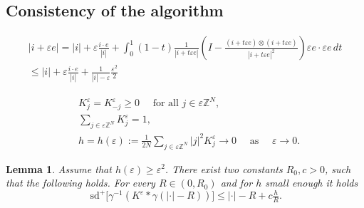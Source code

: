 \documentclass[10pt,a4paper]{amsart}
\newtheorem{lemma}{Lemma}
\newcommand{\Z}{\mathbb{Z}}
\newcommand{\e}{\varepsilon}
\newcommand{\sd}{\,\mathrm{sd}}
\begin{document}
\subsection{Consistency of the algorithm}\label{sec:consistexplicit}

  \begin{multline}
    |i+\e e| = |i| + \e\frac{i\cdot e}{|i|} +
    \int_0^1 (1-t) \frac{1}{|i+t\e e|}\left(I - \frac{(i+t\e e)\otimes (i+t\e e)}{|i+t\e e|^2}
    \right)\e e \cdot \e e\,dt  \\ 
    \le  |i| + \e\frac{i\cdot e}{|i|} + \frac{1}{|i|-\e}\frac{\e^2}{2}
  \end{multline}

\begin{align}
  & \textstyle  K_j^\e= K_{-j}^\e \ge 0 \quad \text{ for all } j\in\e\Z^N, \label{Kpositive} \\
   & \textstyle \sum_{j\in\e\Z^N} K_j^\e=1, \label{Kone}\\
  & \textstyle h=h(\e):= \frac{1}{2N}\sum_{j\in\e\Z^N} |j|^2K_j^\e \to 0 \quad \text{  as } \quad  \e\to 0.  \label{Kh}  
\end{align}

\begin{lemma}\label{lem:evol_balls_g}
    Assume that $h(\e)\ge \e^2$.  There exist two constants $R_0,c>0$, such that the following holds. For every $R\in (0,R_0)$ and  for $h$ small enough  it holds
\begin{equation}\label{eq:speed_ball_g}
\sd^+\Big[\gamma^{-1}(K^\e\ast \gamma(|\cdot|-R))\Big]\le |\cdot|-R + c\tfrac hR.
\end{equation}
\end{lemma}
\end{document}
